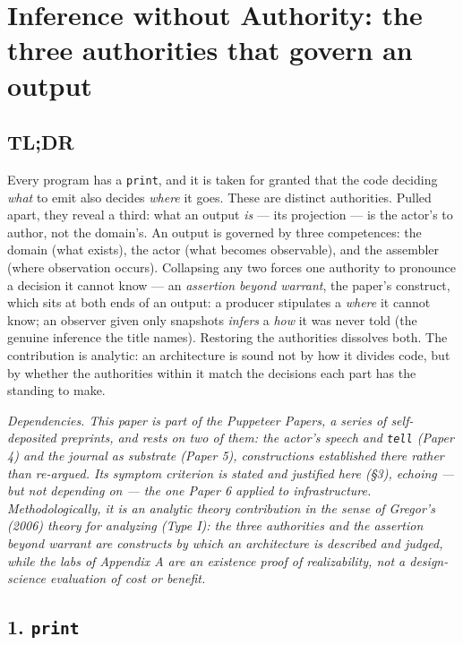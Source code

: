 \documentclass[
]{article}
\begin{document}
\section{Inference without Authority: the three authorities that govern
an
output}\label{inference-without-authority-the-three-authorities-that-govern-an-output}

\subsection{TL;DR}\label{tldr}

Every program has a \texttt{print}, and it is taken for granted that the
code deciding \emph{what} to emit also decides \emph{where} it goes.
These are distinct authorities. Pulled apart, they reveal a third: what
an output \emph{is} --- its projection --- is the actor's to author, not
the domain's. An output is governed by three competences: the domain
(what exists), the actor (what becomes observable), and the assembler
(where observation occurs). Collapsing any two forces one authority to
pronounce a decision it cannot know --- an \emph{assertion beyond
warrant}, the paper's construct, which sits at both ends of an output: a
producer stipulates a \emph{where} it cannot know; an observer given
only snapshots \emph{infers} a \emph{how} it was never told (the genuine
inference the title names). Restoring the authorities dissolves both.
The contribution is analytic: an architecture is sound not by how it
divides code, but by whether the authorities within it match the
decisions each part has the standing to make.

\emph{Dependencies. This paper is part of the Puppeteer Papers, a series
of self-deposited preprints, and rests on two of them: the actor's
speech and \texttt{tell} (Paper 4) and the journal as substrate (Paper
5), constructions established there rather than re-argued. Its symptom
criterion is stated and justified here (§3), echoing --- but not
depending on --- the one Paper 6 applied to infrastructure.
Methodologically, it is an analytic theory contribution in the sense of
Gregor's (2006) theory for analyzing (Type I): the three authorities and
the assertion beyond warrant are constructs by which an architecture is
described and judged, while the labs of Appendix A are an existence
proof of realizability, not a design-science evaluation of cost or
benefit.}

\subsection{\texorpdfstring{1. \texttt{print}}{1. print}}\label{print}
\end{document}
